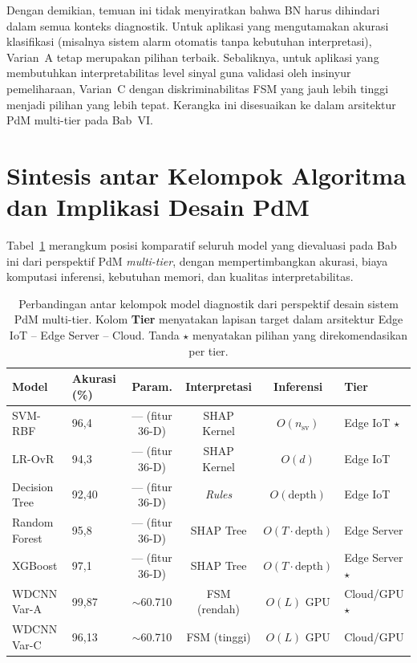 Dengan demikian, temuan ini tidak menyiratkan bahwa BN harus dihindari
dalam semua konteks diagnostik.
Untuk aplikasi yang mengutamakan akurasi klasifikasi (misalnya sistem alarm
otomatis tanpa kebutuhan interpretasi), Varian~A tetap merupakan pilihan
terbaik.
Sebaliknya, untuk aplikasi yang membutuhkan interpretabilitas level sinyal
guna validasi oleh insinyur pemeliharaan, Varian~C dengan diskriminabilitas
FSM yang jauh lebih tinggi menjadi pilihan yang lebih tepat.
Kerangka ini disesuaikan ke dalam arsitektur PdM multi-tier pada Bab~VI.

\section{Sintesis antar Kelompok Algoritma dan Implikasi Desain PdM}
\label{sec:bab4_sintesis}

Tabel~\ref{tab:bab4_sintesis} merangkum posisi komparatif seluruh model
yang dievaluasi pada Bab ini dari perspektif PdM \emph{multi-tier}, dengan mempertimbangkan
akurasi, biaya komputasi inferensi, kebutuhan memori, dan kualitas
interpretabilitas.

\begin{table}[ht]
\caption{Perbandingan antar kelompok model diagnostik dari perspektif
         desain sistem PdM multi-tier. Kolom \textbf{Tier} menyatakan lapisan
         target dalam arsitektur Edge IoT – Edge Server – Cloud.
         Tanda $\star$ menyatakan pilihan yang direkomendasikan per tier.}
\label{tab:bab4_sintesis}
\centering
\small
\begin{tabular}{llcccl}
\toprule
\textbf{Model} & \textbf{Akurasi (\%)} & \textbf{Param.} & \textbf{Interpretasi}
               & \textbf{Inferensi} & \textbf{Tier}\\
\midrule
SVM-RBF         & 96,4  & — (fitur 36-D) & SHAP Kernel & $O(n_\text{sv})$    & Edge IoT $\star$\\
LR-OvR          & 94,3  & — (fitur 36-D) & SHAP Kernel & $O(d)$              & Edge IoT\\
Decision Tree   & 92,40 & — (fitur 36-D) & \emph{Rules} & $O(\text{depth})$  & Edge IoT\\
Random Forest   & 95,8  & — (fitur 36-D) & SHAP Tree   & $O(T \cdot \text{depth})$ & Edge Server\\
XGBoost         & 97,1  & — (fitur 36-D) & SHAP Tree   & $O(T \cdot \text{depth})$ & Edge Server $\star$\\
WDCNN Var-A     & 99,87 & $\sim$60.710   & FSM (rendah) & $O(L)$ GPU          & Cloud/GPU $\star$\\
WDCNN Var-C     & 96,13 & $\sim$60.710   & FSM (tinggi) & $O(L)$ GPU          & Cloud/GPU\\
\bottomrule
\end{tabular}
\end{table}

